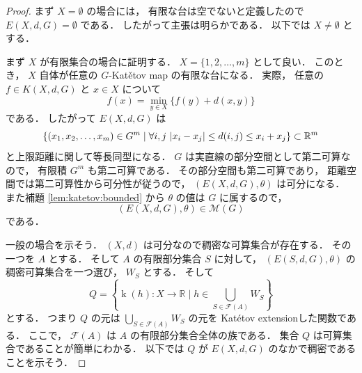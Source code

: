 \documentclass[leqno, 12pt]{jsarticle}
\newcommand{\rr}{\mathbb{R}}
\DeclareMathOperator{\kat}{k}
\newcommand{\KatExt}[1]{\kat(#1)}
\DeclarePairedDelimiter{\abs}{\lvert}{\rvert}
\newcommand{\Met}[1]{\mathscr{M}(#1)}
\newcommand{\KatSpace}[3]{K(#1,#2,#3)}
\newcommand{\Espace}[3]{E(#1,#2,#3)}
\newcommand{\KatDist}{\theta}
\newcommand{\FinSubsets}[1]{\mathcal{F}(#1)}
\begin{document}
\begin{proof}
まず
$X=\emptyset$
の場合には，
有限な台は空でないと定義したので
$\Espace{X}{d}{G}=\emptyset$
である．
したがって主張は明らかである．
以下では
$X\neq\emptyset$
とする．

まず
$X$
が有限集合の場合に証明する．
$X=\{1,2,\dots, m\}$
として良い．
このとき，
$X$
自体が任意の
$G$-Kat\v{e}tov map
の有限な台になる．
実際，
任意の
$f\in\KatSpace{X}{d}{G}$
と
$x\in X$
について
\[
f(x)
=
\min_{y\in X}\{f(y)+d(x,y)\}
\]
である．
したがって
$\Espace{X}{d}{G}$
は
\[
\{(x_{1},x_{2},\dots, x_{m})\in G^{m}\mid\forall i, j\
\abs{x_{i}-x_{j}}\le d(i, j)\le x_{i}+x_{j}\}\subset \rr^{m}
\]
と上限距離に関して等長同型になる．
$G$
は実直線の部分空間として第二可算なので，
有限積
$G^m$
も第二可算である．
その部分空間も第二可算であり，
距離空間では第二可算性から可分性が従うので，
$(\Espace{X}{d}{G}, \KatDist)$
は可分になる．
また補題
\ref{lem:katetov:bounded}
から
$\KatDist$
の値は
$G$
に属するので，
\[
(\Espace{X}{d}{G},\KatDist)\in\Met{G}
\]
である．
\par
一般の場合を示そう．
$(X, d)$
は可分なので稠密な可算集合が存在する．
その一つを
$A$
とする．
そして
$A$
の有限部分集合
$S$
に対して，
$(\Espace{S}{d}{G}, \KatDist)$
の稠密可算集合を一つ選び，
$W_{S}$%
とする．
そして
\[
Q=\left\{\KatExt{h}\colon X\to \rr\mid h\in \bigcup_{S\in \FinSubsets{A}}W_{S}\right\}
\]
とする．
つまり
$Q$
の元は
$\bigcup_{S\in \FinSubsets{A}}W_{S}$
の元を
Kat\'etov extensionした関数である．
ここで，
$\FinSubsets{A}$
は
$A$
の有限部分集合全体の族である．
集合
$Q$
は可算集合であることが簡単にわかる．
以下では
$Q$
が
$\Espace{X}{d}{G}$
のなかで稠密であることを示そう．




\end{proof}
\end{document}
